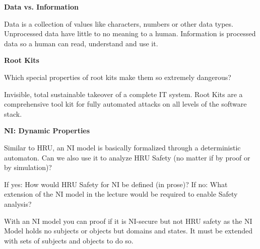 \documentclass[10pt]{exam}  %
\begin{document}
\begin{questions}
\begin{solution}
    \end{solution}

    \question \textbf{Data vs. Information}\hfill

    \begin{solution}
        Data is a collection of values like characters, numbers or other data types. Unprocessed data have little to no meaning to a human.
        Information is processed data so a human can read, understand and use it.
    \end{solution}

    \question \textbf{Root Kits}\hfill

    Which special properties of root kits make them so extremely dangerous?
    \begin{solution}
        Invisible, total sustainable takeover of a complete IT system.
        Root Kits are a comprehensive tool kit for fully automated attacks on all levels of the software stack.
    \end{solution}

    \question \textbf{NI: Dynamic Properties}\hfill

    Similar to HRU, an NI model is basically formalized through a deterministic automaton. Can we also use it to analyze HRU Safety (no matter if by proof or by simulation)?

    If yes: How would HRU Safety for NI be defined (in prose)? If no: What extension of the NI model in the lecture would be required to enable Safety analysis?
    \begin{solution}
        With an NI model you can proof if it is NI-secure but not HRU safety as the NI Model holds no subjects or objects but domains and states. It must be extended with sets of subjects and objects to do so.
    \end{solution}


\end{questions}
\end{document}
